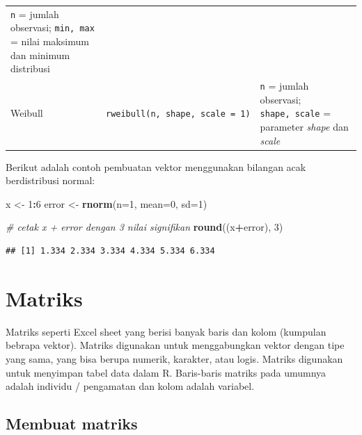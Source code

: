 \documentclass[]{book}
\newenvironment{Shaded}{\begin{snugshade}}{\end{snugshade}}
\newcommand{\CommentTok}[1]{\textcolor[rgb]{0.56,0.35,0.01}{\textit{#1}}}
\newcommand{\DataTypeTok}[1]{\textcolor[rgb]{0.13,0.29,0.53}{#1}}
\newcommand{\DecValTok}[1]{\textcolor[rgb]{0.00,0.00,0.81}{#1}}
\newcommand{\KeywordTok}[1]{\textcolor[rgb]{0.13,0.29,0.53}{\textbf{#1}}}
\newcommand{\NormalTok}[1]{#1}
\newcommand{\OperatorTok}[1]{\textcolor[rgb]{0.81,0.36,0.00}{\textbf{#1}}}
\newcommand{\StringTok}[1]{\textcolor[rgb]{0.31,0.60,0.02}{#1}}
\theoremstyle{definition}
\theoremstyle{definition}
\theoremstyle{definition}
\theoremstyle{remark}
\begin{document}
\begin{longtable}[]{@{}lll@{}}
\begin{minipage}[t]{0.65\columnwidth}
\texttt{n} = jumlah observasi; \texttt{min,\ max} = nilai maksimum dan minimum distribusi\strut
\end{minipage}\tabularnewline
\begin{minipage}[t]{0.07\columnwidth}\raggedright
Weibull\strut
\end{minipage} & \begin{minipage}[t]{0.19\columnwidth}\raggedright
\texttt{rweibull(n,\ shape,\ scale\ =\ 1)}\strut
\end{minipage} & \begin{minipage}[t]{0.65\columnwidth}\raggedright
\texttt{n} = jumlah observasi; \texttt{shape,\ scale} = parameter \emph{shape} dan \emph{scale}\strut
\end{minipage}\tabularnewline
\bottomrule
\end{longtable}

Berikut adalah contoh pembuatan vektor menggunakan bilangan acak berdistribusi normal:

\begin{Shaded}
\begin{Highlighting}[]
\NormalTok{x <-}\StringTok{ }\DecValTok{1}\OperatorTok{:}\DecValTok{6}
\NormalTok{error <-}\StringTok{ }\KeywordTok{rnorm}\NormalTok{(}\DataTypeTok{n=}\DecValTok{1}\NormalTok{, }\DataTypeTok{mean=}\DecValTok{0}\NormalTok{, }\DataTypeTok{sd=}\DecValTok{1}\NormalTok{)}

\CommentTok{# cetak x + error dengan 3 nilai signifikan}
\KeywordTok{round}\NormalTok{((x}\OperatorTok{+}\NormalTok{error), }\DecValTok{3}\NormalTok{)}
\end{Highlighting}
\end{Shaded}

\begin{verbatim}
## [1] 1.334 2.334 3.334 4.334 5.334 6.334
\end{verbatim}

\hypertarget{matriks}{%
\section{Matriks}\label{matriks}}

Matriks seperti Excel sheet yang berisi banyak baris dan kolom (kumpulan bebrapa vektor). Matriks digunakan untuk menggabungkan vektor dengan tipe yang sama, yang bisa berupa numerik, karakter, atau logis. Matriks digunakan untuk menyimpan tabel data dalam R. Baris-baris matriks pada umumnya adalah individu / pengamatan dan kolom adalah variabel.

\hypertarget{creatematrix}{%
\subsection{Membuat matriks}\label{creatematrix}}
\end{document}
